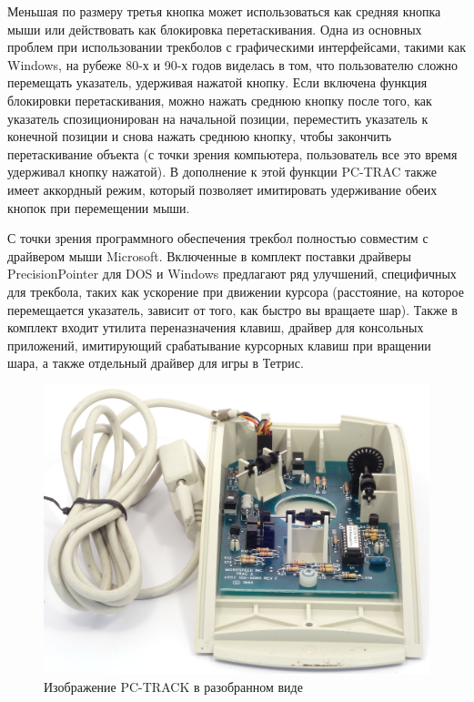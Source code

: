 \documentclass[11pt, a4paper]{article}
\begin{document}
Меньшая по размеру третья кнопка может использоваться как средняя кнопка мыши или действовать как блокировка перетаскивания. Одна из основных проблем при использовании трекболов с графическими интерфейсами, такими как Windows, на рубеже 80-х и 90-х годов виделась в том, что пользователю сложно перемещать указатель, удерживая нажатой кнопку. Если включена функция блокировки перетаскивания, можно нажать среднюю кнопку после того, как указатель спозиционирован на начальной позиции, переместить указатель к конечной позиции и снова нажать среднюю кнопку, чтобы закончить перетаскивание объекта (с точки зрения компьютера, пользователь все это время удерживал кнопку нажатой). В дополнение к этой функции PC-TRAC также имеет аккордный режим, который позволяет имитировать удерживание обеих кнопок при перемещении мыши.

С точки зрения программного обеспечения трекбол полностью совместим с драйвером мыши Microsoft. Включенные в комплект поставки драйверы PrecisionPointer для DOS и Windows предлагают ряд улучшений, специфичных для трекбола, таких как ускорение при движении курсора (расстояние, на которое перемещается указатель, зависит от того, как быстро вы вращаете шар). Также в комплект входит утилита переназначения клавиш, драйвер для консольных приложений, имитирующий срабатывание курсорных клавиш при вращении шара, а также отдельный драйвер для игры в Тетрис.

\begin{figure}[h]
    \centering
    \includegraphics[scale=0.7]{1991_microspeed_pc-track/inside_30.jpg}
    \caption{Изображение PC-TRACK в разобранном виде}
    \label{fig:PCTRACKInside}
    \end{figure}
\end{document}
